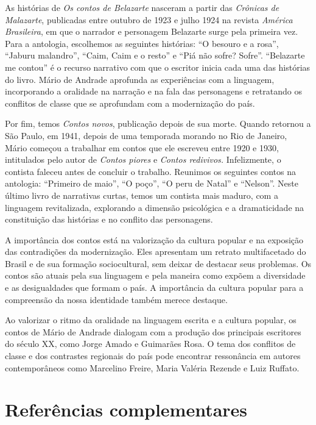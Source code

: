 \documentclass[12pt]{extarticle}
\begin{document}
{As histórias de \emph{Os contos de Belazarte} nasceram a partir das
\emph{Crônicas de Malazarte}, publicadas entre outubro de 1923 e julho
1924 na revista \emph{América Brasileira}, em que o narrador e
personagem Belazarte surge pela primeira vez. Para a antologia,
escolhemos as seguintes histórias: ``O besouro e a rosa'', ``Jaburu
malandro'', ``Caim, Caim e o resto'' e ``Piá não sofre? Sofre''.
``Belazarte me contou'' é o recurso narrativo com que o escritor inicia
cada uma das histórias do livro. Mário de Andrade aprofunda as
experiências com a linguagem, incorporando a oralidade na narração e na
fala das personagens e retratando os conflitos de classe que se
aprofundam com a modernização do país.

Por fim, temos \emph{Contos novos}, publicação depois de sua morte.
Quando retornou a São Paulo, em 1941, depois de uma temporada morando no
Rio de Janeiro, Mário começou a trabalhar em contos que ele escreveu
entre 1920 e 1930, intitulados pelo autor de \emph{Contos piores} e
\emph{Contos redivivos.} Infelizmente, o contista faleceu antes de
concluir o trabalho. Reunimos os seguintes contos na antologia:
``Primeiro de maio'', ``O poço'', ``O peru de Natal'' e ``Nelson''.
Neste último livro de narrativas curtas, temos um contista mais maduro,
com a linguagem revitalizada, explorando a dimensão psicológica e a
dramaticidade na constituição das histórias e no conflito das
personagens.

A importância dos contos está na valorização da cultura popular e na
exposição das contradições da modernização. Eles apresentam um retrato
multifacetado do Brasil e de sua formação sociocultural, sem deixar de
destacar seus problemas. Os contos são atuais pela sua linguagem e pela
maneira como expõem a diversidade e as desigualdades que formam o país.
A importância da cultura popular para a compreensão da nossa identidade
também merece destaque.

Ao valorizar o ritmo da oralidade na linguagem escrita e a cultura
popular, os contos de Mário de Andrade dialogam com a produção dos
principais escritores do século XX, como Jorge Amado e Guimarães Rosa. O
tema dos conflitos de classe e dos contrastes regionais do país pode
encontrar ressonância em autores contemporâneos como Marcelino Freire,
Maria Valéria Rezende e Luiz Ruffato.

\section{Referências complementares}

}
\end{document}
